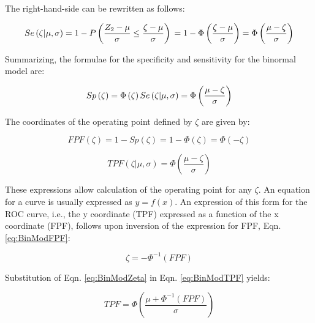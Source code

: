 \documentclass[
]{book}
\begin{document}
The right-hand-side can be rewritten as follows:

\begin{equation*} 
Se\left ( \zeta | \mu, \sigma \right )= 1 - P\left ( \frac{Z_2-\mu}{\sigma} \leq  \frac{\zeta-\mu}{\sigma} \right )\\
=1-\Phi\left (  \frac{\zeta-\mu}{\sigma}\right )=\Phi\left (  \frac{\mu-\zeta}{\sigma}\right )
\end{equation*}

Summarizing, the formulae for the specificity and sensitivity for the binormal model are:

\begin{equation} 
Sp\left ( \zeta \right ) = \Phi\left ( \zeta \right )\\
Se\left ( \zeta | \mu, \sigma \right ) = \Phi\left (  \frac{\mu-\zeta}{\sigma}\right )
\label{eq:BinModSeSp}
\end{equation}

The coordinates of the operating point defined by \(\zeta\) are given by:

\begin{equation} 
FPF\left ( \zeta \right ) = 1 - Sp\left ( \zeta \right ) = 1 - \Phi\left ( \zeta \right ) = \Phi\left ( -\zeta \right )
\label{eq:BinModFPF}
\end{equation}

\begin{equation} 
TPF\left ( \zeta | \mu, \sigma \right ) = \Phi\left ( \frac{\mu-\zeta}{\sigma} \right )
\label{eq:BinModTPF}
\end{equation}

These expressions allow calculation of the operating point for any \(\zeta\). An equation for a curve is usually expressed as \(y=f(x)\). An expression of this form for the ROC curve, i.e., the y coordinate (TPF) expressed as a function of the x coordinate (FPF), follows upon inversion of the expression for FPF, Eqn. \eqref{eq:BinModFPF}:

\begin{equation} 
\zeta = -\Phi^{-1}\left ( FPF \right )
\label{eq:BinModZeta}
\end{equation}

Substitution of Eqn. \eqref{eq:BinModZeta} in Eqn. \eqref{eq:BinModTPF} yields:

\begin{equation} 
TPF = \Phi\left ( \frac{\mu + \Phi^{-1}\left (FPF  \right )}{\sigma} \right )
\label{eq:BinModRocCurve1}
\end{equation}
\end{document}
